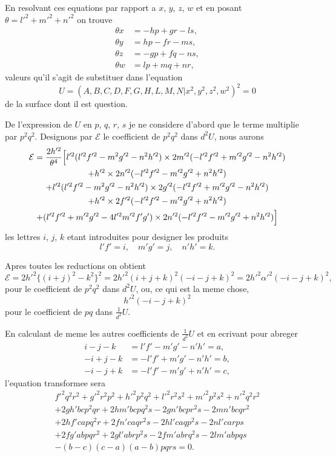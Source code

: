 \documentclass[11pt,a4paper]{article}
\theoremstyle{plain}
\begin{document}
En resolvant ces equations par rapport a $x$, $y$, $z$, $w$ et en posant $\theta = l'^2 + m'^2 + n'^2$ on trouve
\begin{align*}
\theta x &= -hp + gr - ls, \\
\theta y &= hp - fr - ms, \\
\theta z &= -gp + fq - ns, \\
\theta w &= lp + mq + nr,
\end{align*}
valeurs qu'il s'agit de substituer dans l'equation
\[
U = (A, B, C, D, F, G, H, L, M, N | x^2, y^2, z^2, w^2)^2 = 0
\]
de la surface dont il est question.

De l'expression de $U$ en $p$, $q$, $r$, $s$ je ne considere d'abord que le terme multiplie par $p^2q^2$. Designons par $\mathcal{E}$ le coefficient de $p^2q^2$ dans $d^2U$, nous aurons
\begin{multline*}
\mathcal{E} = 
\frac{2h'^2}{\theta^4}\Bigl[ l'^2(l'^2f'^2 - m^2g'^2 - n^2h'^2) \times 2m'^2(-l'^2f'^2 + m'^2g'^2 - n^2h'^2) \\
+ h'^2 \times 2n'^2(-l'^2f'^2 - m'^2g'^2 + n^2h'^2) \\
+ l'^2(l'^2f'^2 - m^2g'^2 - n^2h'^2) \times 2g'^2(-l'^2f'^2 + m'^2g'^2 - n^2h'^2) \\
+ h'^2 \times 2f'^2(-l'^2f'^2 - m'^2g'^2 + n^2h'^2) \\
+ (l'^2f'^2 + m'^2g'^2 - 4l'^2m'^2f'g') \times 2n'^2(-l'^2f'^2 - m'^2g'^2 + n^2h'^2) \Bigr]
\end{multline*}
les lettres $i$, $j$, $k$ etant introduites pour designer les produits
\[
l'f' = i, \quad m'g' = j, \quad n'h' = k.
\]

Apres toutes les reductions on obtient
\[
\mathcal{E} = 2h'^2\{(i+j)^2 - k^2\}^2 = 2h'^2(i+j+k)^2(-i-j+k)^2 = 2h'^2\alpha'^2(-i-j+k)^2,
\]
pour le coefficient de $p^2q^2$ dans $d^2U$, ou, ce qui est la meme chose,
\[
h'^2(-i-j+k)^2
\]
pour le coefficient de $pq$ dans $\frac{1}{d^2}U$.

En calculant de meme les autres coefficients de $\frac{1}{d^2}U$ et en ecrivant pour abreger
\begin{align*}
i - j - k &= l'f' - m'g' - n'h' = a, \\
-i + j - k &= -l'f' + m'g' - n'h' = b, \\
-i - j + k &= -l'f' - m'g' + n'h' = c,
\end{align*}
l'equation transformee sera
\begin{multline*}
f'^2q^2r^2 + g'^2r^2p^2 + h'^2p^2q^2 + l'^2r^2s^2 + m'^2p^2s^2 + n'^2q^2r^2 \\
+ 2gh'bc p^2qr + 2hm'bcpq^2s - 2gn'bc pr^2s - 2mn'bc qr^2 \\
+ 2hf'ca pq^2r + 2fn'ca qr^2s - 2hl'ca qp^2s - 2nl'ca rps \\
+ 2fg'ab pqr^2 + 2gl'ab rp^2s - 2fm'ab rq^2s - 2lm'ab pqs \\
- (b-c)(c-a)(a-b)pqrs = 0.
\end{multline*}
\end{document}
